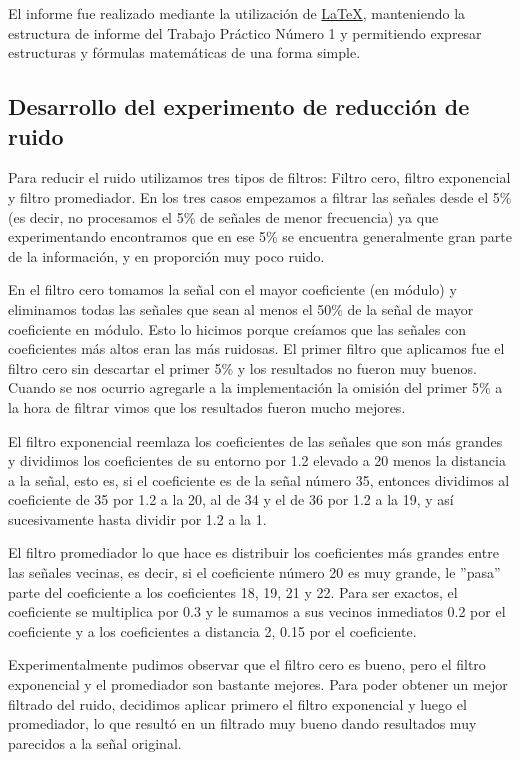 El informe fue realizado mediante la utilizaci\'on de \href{http://www.latex-project.org/}{LaTeX},
 manteniendo la estructura de informe del Trabajo Pr\'actico N\'umero 1 y
permitiendo expresar estructuras y f\'ormulas matem\'aticas de una forma simple.

\subsection{Desarrollo del experimento de reducci\'on de ruido}

Para reducir el ruido utilizamos tres tipos de filtros: Filtro cero, filtro exponencial y filtro promediador.
En los tres casos empezamos a filtrar las se\~nales desde el 5\% (es decir, no procesamos el 5\% de se\~nales
de menor frecuencia) ya que experimentando encontramos que en ese 5\% se encuentra generalmente gran parte de
la informaci\'on, y en proporci\'on muy poco ruido.

En el filtro cero tomamos la se\~nal con el mayor coeficiente (en m\'odulo) y eliminamos todas las se\~nales que sean
al menos el 50\% de la se\~nal de mayor coeficiente en m\'odulo. Esto lo hicimos porque cre\'iamos que las se\~nales
con coeficientes m\'as altos eran las m\'as ruidosas.
El primer filtro que aplicamos fue el filtro cero sin descartar el primer 5\% y los resultados no fueron muy buenos.
Cuando se nos ocurrio agregarle a la implementaci\'on la omisi\'on del primer 5\% a la hora de filtrar vimos que los 
resultados fueron mucho mejores.

El filtro exponencial reemlaza los coeficientes de las se\~nales que son m\'as grandes y dividimos los coeficientes de su entorno por 1.2 elevado a 20 menos la distancia a la se\~nal, esto es, si el coeficiente es de la se\~nal n\'umero 35, entonces dividimos al coeficiente de 35 por 1.2 a la 20, al de 34 y el de 36 por 1.2 a la 19, y as\'i sucesivamente hasta dividir por 1.2 a la 1.

El filtro promediador lo que hace es distribuir los coeficientes m\'as grandes entre las se\~nales vecinas, es decir, si el coeficiente n\'umero 20 es muy grande, le ''pasa'' parte del coeficiente a los coeficientes 18, 19, 21 y 22. Para ser exactos, el coeficiente se multiplica por 0.3 y le sumamos a sus vecinos inmediatos 0.2 por el coeficiente y a los coeficientes a distancia 2, 0.15 por el coeficiente.

Experimentalmente pudimos observar que el filtro cero es bueno, pero el filtro exponencial y el promediador son bastante mejores. Para poder obtener un mejor filtrado del ruido, decidimos aplicar primero el filtro exponencial y luego el promediador, lo que result\'o en un filtrado muy bueno dando resultados muy parecidos a la se\~nal original.
